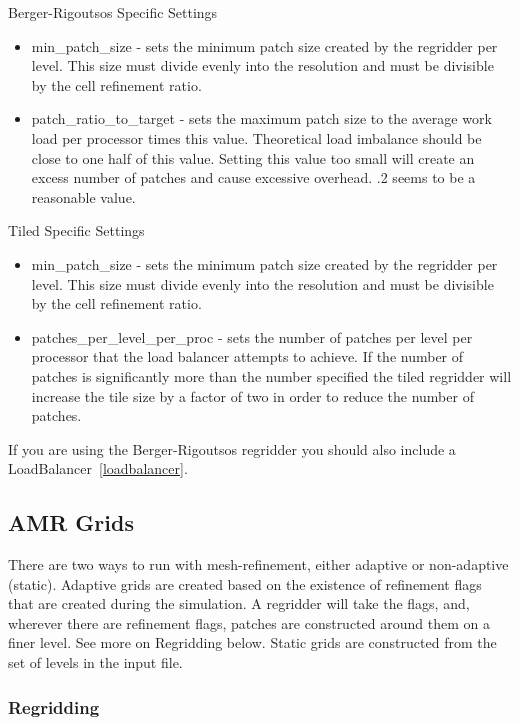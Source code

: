 Berger-Rigoutsos Specific Settings 

\begin{itemize}
\item min\_patch\_size - sets the minimum patch size created by the
  regridder per level. This size must divide evenly into the
  resolution and must be divisible by the cell refinement ratio.
\item patch\_ratio\_to\_target - sets the maximum patch size to the
  average work load per processor times this value. Theoretical load
  imbalance should be close to one half of this value. Setting this
  value too small will create an excess number of patches and cause
  excessive overhead. .2 seems to be a reasonable value.
\end{itemize}

Tiled Specific Settings 
\begin{itemize}
\item min\_patch\_size - sets the minimum patch size created by the
  regridder per level. This size must divide evenly into the
  resolution and must be divisible by the cell refinement ratio.
\item patches\_per\_level\_per\_proc - sets the number of patches per
  level per processor that the load balancer attempts to achieve. If
  the number of patches is significantly more than the number
  specified the tiled regridder will increase the tile size by a
  factor of two in order to reduce the number of patches.
\end{itemize}

If you are using the Berger-Rigoutsos regridder you should also
include a  LoadBalancer~\ref{loadbalancer}.


\subsection{AMR Grids}


There are two ways to run with mesh-refinement, either adaptive or
non-adaptive (static). Adaptive grids are created based on the
existence of refinement flags that are created during the
simulation. A regridder will take the flags, and, wherever there are
refinement flags, patches are constructed around them on a finer
level. See more on Regridding below. Static grids are constructed from
the set of levels in the input file.

\subsubsection{Regridding}


